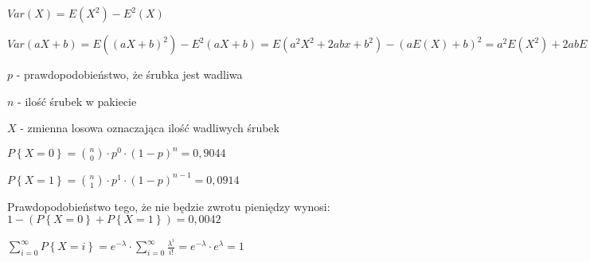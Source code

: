 \documentclass[fleqn]{article}
\begin{document}
\medskip
{}
\medskip

$Var(X)=E(X^2)-E^2(X)$

$Var\left( aX+b\right) =E\left(\left( aX+b\right)^2\right) - E^2\left( aX+b \right)=E\left( a^2X^2+2abx+b^2\right) -\left(aE\left( X\right)+b\right)^2=a^2E\left(X^2\right)+2abE\left(X\right)-a^2E^2\left(X\right)-2abE\left(X\right)-b^2=a^2\cdot\left(E\left(X^2\right)-E^2\left(X\right)\right)=a^2Var\left(X\right)$

\medskip
{}
\medskip

$p$ - prawdopodobieństwo, że śrubka jest wadliwa

$n$ - ilość śrubek w pakiecie

$X$ - zmienna losowa oznaczająca ilość wadliwych śrubek

$P\left\lbrace X=0\right\rbrace={n\choose 0}\cdot p^0\cdot\left(1-p\right)^n=0,9044$

$P\left\lbrace X=1\right\rbrace={n\choose 1}\cdot p^1\cdot\left(1-p\right)^{n-1}=0,0914$

Prawdopodobieństwo tego, że nie będzie zwrotu pieniędzy wynosi: $1-\left(P\left\lbrace X=0\right\rbrace + P\left\lbrace X=1\right\rbrace \right)=0,0042$

\medskip
{}
\medskip

$\sum_{i=0}^{\infty}P\left\lbrace X=i\right\rbrace=e^{-\lambda}\cdot\sum_{i=0}^{\infty}\frac{\lambda^i}{i!}=e^{-\lambda}\cdot e^\lambda=1$
\end{document}
